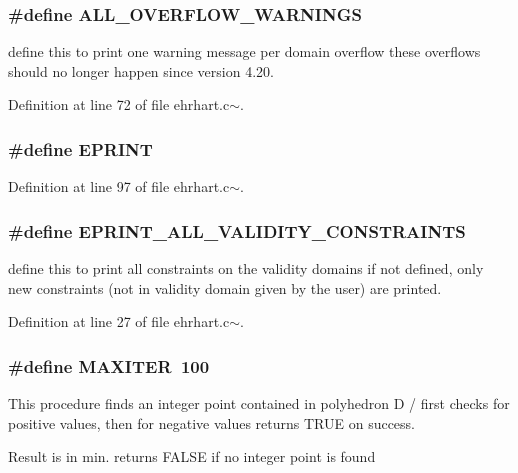 \subsubsection{\setlength{\rightskip}{0pt plus 5cm}\#define ALL\_\-OVERFLOW\_\-WARNINGS}\label{ehrhart_8c~_a2}


define this to print one warning message per domain overflow these overflows should no longer happen since version 4.20.



Definition at line 72 of file ehrhart.c$\sim$.
\subsubsection{\setlength{\rightskip}{0pt plus 5cm}\#define EPRINT}\label{ehrhart_8c~_a3}




Definition at line 97 of file ehrhart.c$\sim$.
\subsubsection{\setlength{\rightskip}{0pt plus 5cm}\#define EPRINT\_\-ALL\_\-VALIDITY\_\-CONSTRAINTS}\label{ehrhart_8c~_a0}


define this to print all constraints on the validity domains if not defined, only new constraints (not in validity domain given by the user) are printed.



Definition at line 27 of file ehrhart.c$\sim$.
\subsubsection{\setlength{\rightskip}{0pt plus 5cm}\#define MAXITER\ 100}\label{ehrhart_8c~_a4}


This procedure finds an integer point contained in polyhedron D / first checks for positive values, then for negative values returns TRUE on success.

Result is in min. returns FALSE if no integer point is found





